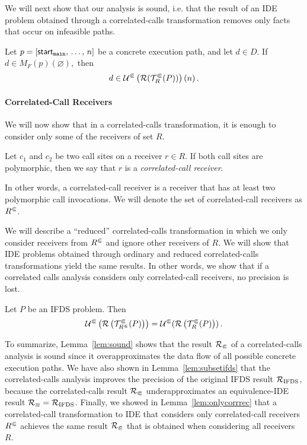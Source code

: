 We will next show that our analysis is sound, i.e. that the result of an IDE problem obtained through a correlated-calls transformation removes only facts that occur on infeasible paths. 

\begin{lemma}[Soundness]\label{lem:sound}
  Let $p=[\textsf{start}_\texttt{main},\,\dots,\,n]$ be a concrete execution path, and let $d\in D$.
  If $d\in M_F(p)(\varnothing),$
  then
  \begin{equation}
    d\in \mathcal U^\Subset\left(\mathcal R(\mathcal T^\Subset_R(P))\right)(n)\,.
  \end{equation}
\end{lemma}

\paragraph{Correlated-Call Receivers}\label{sec:ccreceivers}
We will now show that in a correlated-calls transformation, it is enough to consider only some of the receivers of set $R$.

\begin{definition}
Let $c_1$ and $c_2$ be two call sites on a receiver $r\in R$.
  If both call sites are polymorphic, then we say that $r$ is a \textit{correlated-call receiver}.
\end{definition}
In other words, a correlated-call receiver is a receiver that has at least two polymorphic call invocations.
We will denote the set of correlated-call receivers as ${R^\Subset}$.

We will describe a ``reduced'' correlated-calls transformation in which we only consider receivers from ${R^\Subset}$ and ignore other receivers of $R$. We will show that IDE problems obtained through ordinary and reduced correlated-calls transformations yield the same results.
In other words, we show that if a correlated calls analysis considers only correlated-call receivers, no precision is lost.

\begin{lemma}\label{lem:onlycorrrec}
  Let $P$ be an IFDS problem. Then
  \begin{equation}
    \mathcal U^\Subset\left(\mathcal R\left(\mathcal T^\Subset_{R^\Subset}(P)\right)\right)=\mathcal U^\Subset(\mathcal R\left(\mathcal T^\Subset_R(P)\right))\,.
  \end{equation}
\end{lemma}

To summarize, Lemma~\ref{lem:sound} shows that the result $\mathcal R_\Subset$ of a correlated-calls analysis is sound since it overapproximates the data flow of all possible concrete execution paths.
We have also shown in Lemma~\ref{lem:subsetifds} that the correlated-calls analysis improves the precision of the original IFDS result $\mathcal R_\text{IFDS}$, because the correlated-calls result $\mathcal R_\Subset$ underapproximates an equivalence-IDE result $\mathcal R_\equiv=\mathcal R_\text{IFDS}$.
Finally, we showed in Lemma~\ref{lem:onlycorrrec} that a correlated-call transformation to IDE that considers only correlated-call receivers ${R^\Subset}$ achieves the same result $\mathcal R_\Subset$ that is obtained when considering all receivers $R$.

